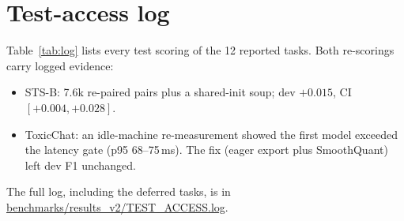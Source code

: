\documentclass[11pt]{article}
\begin{document}
\section{Test-access log}\label{app:log}
Table~\ref{tab:log} lists every test scoring of the 12 reported tasks. Both re-scorings carry logged evidence:
\begin{itemize}
  \item STS-B: 7.6k re-paired pairs plus a shared-init soup; dev $+0.015$, CI $[+0.004, +0.028]$.
  \item ToxicChat: an idle-machine re-measurement showed the first model exceeded the latency gate (p95 68--75\,ms). The fix (eager export plus SmoothQuant) left dev F1 unchanged.
\end{itemize}
The full log, including the deferred tasks, is in \url{benchmarks/results_v2/TEST_ACCESS.log}.

\end{document}
